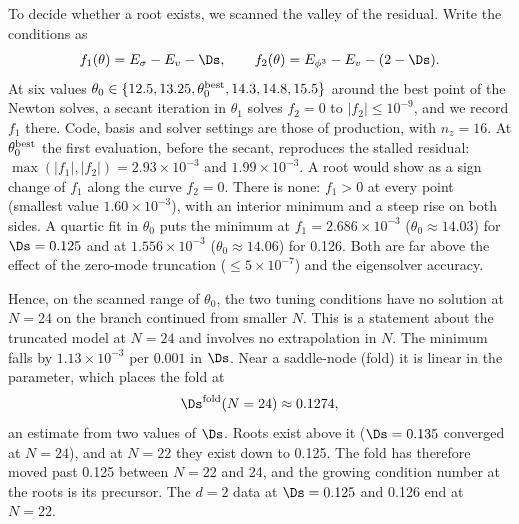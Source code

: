 To decide whether a root exists, we scanned the valley of the residual. Write the conditions as
\begin{equation}
 f_1(\theta)=E_\sigma-E_v-\Ds,\qquad f_2(\theta)=E_{\phi^3}-E_v-(2-\Ds).
\end{equation}
At six values $\theta_0\in\{12.5,13.25,\theta_0^{\rm best},14.3,14.8,15.5\}$ around the best point of the Newton solves,
a secant iteration in $\theta_1$ solves $f_2=0$ to $|f_2|\le10^{-9}$, and we record $f_1$ there. Code, basis and solver
settings are those of production, with $n_z=16$. At $\theta_0^{\rm best}$ the first evaluation, before the secant,
reproduces the stalled residual: $\max(|f_1|,|f_2|)=2.93\times10^{-3}$ and $1.99\times10^{-3}$. A root would show as a
sign change of $f_1$ along the curve $f_2=0$. There is none: $f_1>0$ at every point (smallest value
$1.60\times10^{-3}$), with an interior minimum and a steep rise on both sides. A quartic fit in $\theta_0$ puts the
minimum at $f_1=2.686\times10^{-3}$ ($\theta_0\approx14.03$) for $\Ds=0.125$ and at $1.556\times10^{-3}$
($\theta_0\approx14.06$) for 0.126. Both are far above the effect of the zero-mode truncation ($\le5\times10^{-7}$) and
the eigensolver accuracy.

Hence, on the scanned range of $\theta_0$, the two tuning conditions have no solution at $N=24$ on the branch continued
from smaller $N$. This is a statement about the truncated model at $N=24$ and involves no extrapolation in $N$. The
minimum falls by $1.13\times10^{-3}$ per $0.001$ in $\Ds$. Near a saddle-node (fold) it is linear in the parameter,
which places the fold at
\begin{equation}
 \Ds^{\rm fold}(N=24)\approx0.1274,
\end{equation}
an estimate from two values of $\Ds$. Roots exist above it ($\Ds=0.135$ converged at $N=24$), and at $N=22$ they exist
down to 0.125. The fold has therefore moved past 0.125 between $N=22$ and 24, and the growing condition number at the
roots is its precursor. The $d=2$ data at $\Ds=0.125$ and 0.126 end at $N=22$.

